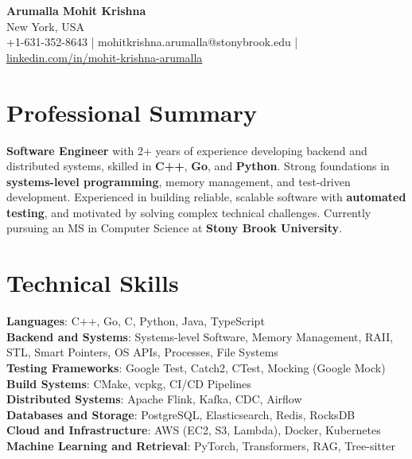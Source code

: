 \documentclass[letterpaper,11pt]{article}
\begin{document}
\begin{center}
  {\Large \textbf{Arumalla Mohit Krishna}} \\
  New York, USA \\
  +1-631-352-8643 \enspace | \enspace mohitkrishna.arumalla@stonybrook.edu \enspace | \enspace \href{https://www.linkedin.com/in/mohit-krishna-arumalla}{linkedin.com/in/mohit-krishna-arumalla}
\end{center}

\section{Professional Summary}
  \begin{itemize}[leftmargin=0.15in, label={}]
    \small{\item{
     \textbf{Software Engineer} with 2+ years of experience developing backend and distributed systems, skilled in \textbf{C++}, \textbf{Go}, and \textbf{Python}. Strong foundations in \textbf{systems-level programming}, memory management, and test-driven development. Experienced in building reliable, scalable software with \textbf{automated testing}, and motivated by solving complex technical challenges. Currently pursuing an MS in Computer Science at \textbf{Stony Brook University}.
    }}
  \end{itemize}
\vspace{-16pt}

\section{Technical Skills}
 \begin{itemize}[leftmargin=0.15in, label={}]
    \small{\item{
     \textbf{Languages}: C++, Go, C, Python, Java, TypeScript \\
     \textbf{Backend and Systems}: Systems-level Software, Memory Management, RAII, STL, Smart Pointers, OS APIs, Processes, File Systems \\
     \textbf{Testing Frameworks}: Google Test, Catch2, CTest, Mocking (Google Mock) \\
     \textbf{Build Systems}: CMake, vcpkg, CI/CD Pipelines \\
     \textbf{Distributed Systems}: Apache Flink, Kafka, CDC, Airflow \\
     \textbf{Databases and Storage}: PostgreSQL, Elasticsearch, Redis, RocksDB \\
     \textbf{Cloud and Infrastructure}: AWS (EC2, S3, Lambda), Docker, Kubernetes \\
     \textbf{Machine Learning and Retrieval}: PyTorch, Transformers, RAG, Tree-sitter
    }}
 \end{itemize}
\vspace{-16pt}
\end{document}
